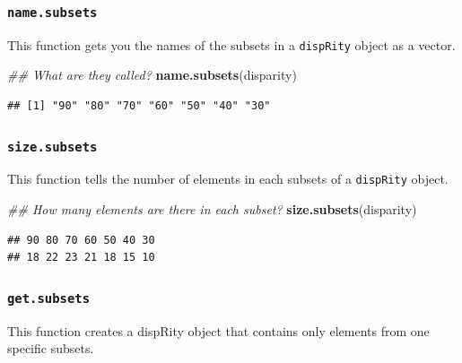 \documentclass[
]{book}
\newenvironment{Shaded}{\begin{snugshade}}{\end{snugshade}}
\newcommand{\CommentTok}[1]{\textcolor[rgb]{0.56,0.35,0.01}{\textit{#1}}}
\newcommand{\KeywordTok}[1]{\textcolor[rgb]{0.13,0.29,0.53}{\textbf{#1}}}
\newcommand{\NormalTok}[1]{#1}
\newcommand{\OperatorTok}[1]{\textcolor[rgb]{0.81,0.36,0.00}{\textbf{#1}}}
\newcommand{\StringTok}[1]{\textcolor[rgb]{0.31,0.60,0.02}{#1}}
\begin{document}
\hypertarget{name.subsets}{%
\subsubsection{\texorpdfstring{\texttt{name.subsets}}{name.subsets}}\label{name.subsets}}

This function gets you the names of the subsets in a \texttt{dispRity} object as a vector.

\begin{Shaded}
\begin{Highlighting}[]
\CommentTok{\#\# What are they called?}
\KeywordTok{name.subsets}\NormalTok{(disparity)}
\end{Highlighting}
\end{Shaded}

\begin{verbatim}
## [1] "90" "80" "70" "60" "50" "40" "30"
\end{verbatim}

\hypertarget{size.subsets}{%
\subsubsection{\texorpdfstring{\texttt{size.subsets}}{size.subsets}}\label{size.subsets}}

This function tells the number of elements in each subsets of a \texttt{dispRity} object.

\begin{Shaded}
\begin{Highlighting}[]
\CommentTok{\#\# How many elements are there in each subset?}
\KeywordTok{size.subsets}\NormalTok{(disparity)}
\end{Highlighting}
\end{Shaded}

\begin{verbatim}
## 90 80 70 60 50 40 30 
## 18 22 23 21 18 15 10
\end{verbatim}

\hypertarget{get.subsets}{%
\subsubsection{\texorpdfstring{\texttt{get.subsets}}{get.subsets}}\label{get.subsets}}

This function creates a dispRity object that contains only elements from one specific subsets.

\begin{Shaded}
\end{Shaded}
\end{document}
